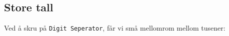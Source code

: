 \subsection*{Store tall}
Ved å skru på \texttt{Digit Seperator}, får vi små mellomrom mellom tusener:
\begin{figure}
	 \\
\end{figure}
